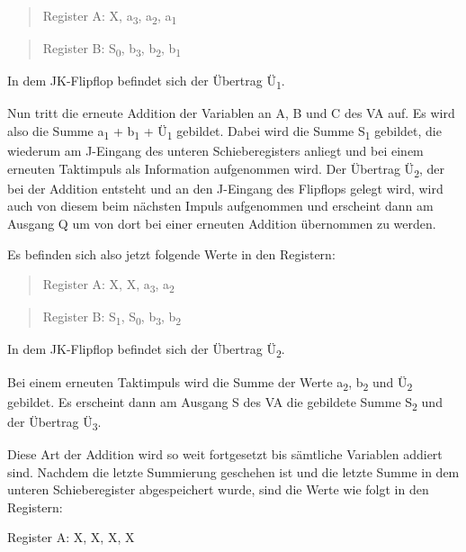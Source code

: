 \begin{quote}
  Register A: X,  a\textsubscript{3}, a\textsubscript{2}, a\textsubscript{1}
\end{quote}


\begin{quote}
  Register B: S\textsubscript{0}, b\textsubscript{3}, b\textsubscript{2}, b\textsubscript{1}
\end{quote}


In dem JK-Flipflop befindet sich der Übertrag Ü\textsubscript{1}.

Nun tritt die erneute Addition der Variablen an A, B und C des VA auf. Es wird also die Summe a\textsubscript{1} + b\textsubscript{1} + Ü\textsubscript{1} gebildet. Dabei wird die Summe S\textsubscript{1} gebildet, die wiederum am J-Eingang des unteren Schieberegisters anliegt und bei einem erneuten Taktimpuls als Information aufgenommen wird. Der Übertrag Ü\textsubscript{2}, der bei der Addition entsteht und an den J-Eingang des Flipflops gelegt wird, wird auch von diesem beim nächsten Impuls aufgenommen und erscheint dann am Ausgang Q um von dort bei einer erneuten Addition übernommen zu werden.

Es befinden sich also jetzt folgende Werte in den Registern:

\begin{quote}
  Register A: X,   X, a\textsubscript{3}, a\textsubscript{2}
\end{quote}


\begin{quote}
  Register B: S\textsubscript{1}, S\textsubscript{0}, b\textsubscript{3}, b\textsubscript{2}
\end{quote}


In dem JK-Flipflop befindet sich der Übertrag Ü\textsubscript{2}.

Bei einem erneuten Taktimpuls wird die Summe der Werte a\textsubscript{2}, b\textsubscript{2} und Ü\textsubscript{2} gebildet. Es erscheint dann am Ausgang S des VA die gebildete Summe S\textsubscript{2} und der Übertrag Ü\textsubscript{3}.

Diese Art der Addition wird so weit fortgesetzt bis sämtliche Variablen addiert sind. Nachdem die letzte Summierung geschehen ist und die letzte Summe in dem unteren Schieberegister abgespeichert wurde, sind die Werte wie folgt in den Registern:

Register A: X,   X,  X,  X

